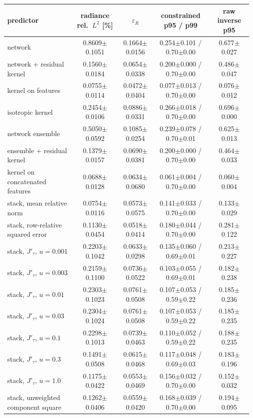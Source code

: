 \begin{tabular}{lcccc}
\toprule
predictor & radiance rel.\ $L^2$ [\%] & $\varepsilon_R$ & constrained p95 / p99 & raw inverse p95 \\
\midrule
network & 0.8609$\pm$0.1051 & 0.1664$\pm$0.0156 & 0.254$\pm$0.101 / 0.70$\pm$0.00 & 0.677$\pm$0.027 \\
network + residual kernel & 0.1560$\pm$0.0184 & 0.0654$\pm$0.0338 & 0.200$\pm$0.000 / 0.70$\pm$0.00 & 0.486$\pm$0.047 \\
kernel on features & 0.0755$\pm$0.0114 & 0.0472$\pm$0.0404 & 0.077$\pm$0.013 / 0.70$\pm$0.00 & 0.076$\pm$0.012 \\
isotropic kernel & 0.2454$\pm$0.0106 & 0.0886$\pm$0.0331 & 0.266$\pm$0.018 / 0.70$\pm$0.00 & 0.696$\pm$0.000 \\
network ensemble & 0.5050$\pm$0.0592 & 0.1085$\pm$0.0254 & 0.239$\pm$0.078 / 0.70$\pm$0.01 & 0.625$\pm$0.013 \\
ensemble + residual kernel & 0.1379$\pm$0.0157 & 0.0690$\pm$0.0381 & 0.200$\pm$0.000 / 0.70$\pm$0.00 & 0.464$\pm$0.033 \\
kernel on concatenated features & 0.0688$\pm$0.0128 & 0.0634$\pm$0.0680 & 0.061$\pm$0.004 / 0.70$\pm$0.00 & 0.060$\pm$0.004 \\
stack, mean relative norm & 0.0754$\pm$0.0116 & 0.0573$\pm$0.0575 & 0.141$\pm$0.033 / 0.70$\pm$0.00 & 0.133$\pm$0.029 \\
stack, row-relative squared error & 0.1130$\pm$0.0454 & 0.0518$\pm$0.0414 & 0.180$\pm$0.044 / 0.70$\pm$0.00 & 0.281$\pm$0.122 \\
stack, $J'_\tau$, $u=0.001$ & 0.2203$\pm$0.1042 & 0.0633$\pm$0.0298 & 0.135$\pm$0.060 / 0.69$\pm$0.01 & 0.213$\pm$0.227 \\
stack, $J'_\tau$, $u=0.003$ & 0.2159$\pm$0.1100 & 0.0736$\pm$0.0522 & 0.103$\pm$0.055 / 0.69$\pm$0.01 & 0.182$\pm$0.238 \\
stack, $J'_\tau$, $u=0.01$ & 0.2303$\pm$0.1023 & 0.0761$\pm$0.0508 & 0.107$\pm$0.053 / 0.59$\pm$0.22 & 0.185$\pm$0.236 \\
stack, $J'_\tau$, $u=0.03$ & 0.2304$\pm$0.1024 & 0.0761$\pm$0.0508 & 0.107$\pm$0.053 / 0.59$\pm$0.22 & 0.185$\pm$0.235 \\
stack, $J'_\tau$, $u=0.1$ & 0.2298$\pm$0.1013 & 0.0739$\pm$0.0463 & 0.110$\pm$0.052 / 0.59$\pm$0.22 & 0.188$\pm$0.235 \\
stack, $J'_\tau$, $u=0.3$ & 0.1491$\pm$0.0508 & 0.0615$\pm$0.0468 & 0.117$\pm$0.048 / 0.69$\pm$0.03 & 0.183$\pm$0.196 \\
stack, $J'_\tau$, $u=1.0$ & 0.1175$\pm$0.0422 & 0.0553$\pm$0.0469 & 0.156$\pm$0.032 / 0.70$\pm$0.00 & 0.152$\pm$0.032 \\
stack, unweighted component square & 0.1262$\pm$0.0406 & 0.0559$\pm$0.0420 & 0.168$\pm$0.039 / 0.70$\pm$0.00 & 0.194$\pm$0.095 \\
\bottomrule
\end{tabular}
